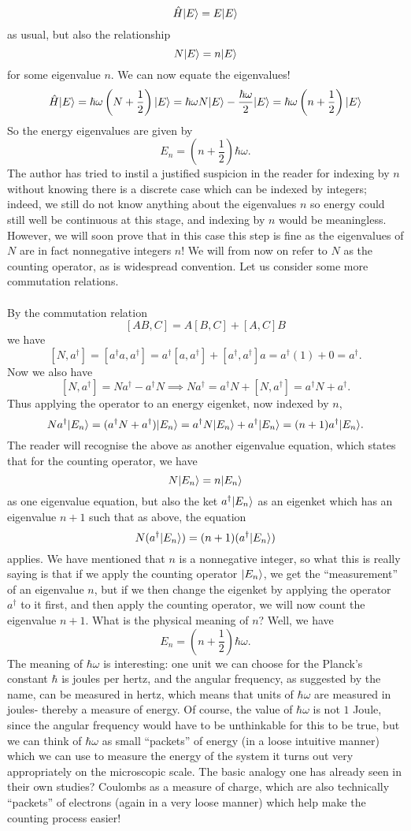 $$
\hat{H}|E\rangle=E|E\rangle
$$
as usual, but also the relationship
$$
N|E\rangle=n|E\rangle
$$
for some eigenvalue $n$. We can now equate the eigenvalues!
$$
\hat{H}|E\rangle=\hbar\omega\left(N+\frac{1}{2}\right)|E\rangle=\hbar \omega N|E\rangle-\frac{\hbar\omega}{2}|E\rangle=\hbar\omega\left(n+\frac{1}{2}\right)|E\rangle
$$
So the energy eigenvalues are given by 
$$
E_{n}=\left(n+\frac{1}{2}\right)\hbar\omega.
$$
The author has tried to instil a justified suspicion in the reader for indexing by $n$ without knowing there is a discrete case which can be indexed by integers; indeed, we still do not know anything about the eigenvalues $n$ so energy could still well be continuous at this stage, and indexing by $n$ would be meaningless. However, we will soon prove that in this case this step is fine as the eigenvalues of $N$ are in fact nonnegative integers $n$! We will from now on refer to $N$ as the counting operator, as is widespread convention. Let us consider some more commutation relations.
\\\\
By the commutation relation 
$$
[AB,C]=A[B,C]+[A,C]B
$$
we have
$$
[N,a^{\dagger}]=[a^{\dagger}a,a^{\dagger}]=a^{\dagger}[a,a^{\dagger}]+[a^{\dagger},a^{\dagger}]a=a^{\dagger}(1)+0=a^{\dagger}.
$$
Now we also have
$$
[N,a^{\dagger}]=Na^{\dagger}-a^{\dagger}N\implies Na^{\dagger}=a^{\dagger}N+[N,a^{\dagger}]=a^{\dagger}N+a^{\dagger}.
$$
Thus applying the operator to an energy eigenket, now indexed by $n$,
$$
Na^{\dagger}|E_{n}\rangle=(a^{\dagger}N+a^{\dagger})|E_{n}\rangle=a^{\dagger}N|E_{n}\rangle+a^{\dagger}|E_{n}\rangle=(n+1)a^{\dagger}|E_{n}\rangle.
$$
The reader will recognise the above as another eigenvalue equation, which states that for the counting operator, we have 
$$
N|E_{n}\rangle=n|E_{n}\rangle
$$
as one eigenvalue equation, but also the ket $a^{\dagger}|E_{n}\rangle$ as an eigenket which has an eigenvalue $n+1$ such that as above, the equation
$$
N(a^{\dagger}|E_{n}\rangle)=(n+1)(a^{\dagger}|E_{n}\rangle)
$$
applies. We have mentioned that $n$ is a nonnegative integer, so what this is really saying is that if we apply the counting operator $|E_{n}\rangle$, we get the ``measurement'' of an eigenvalue $n$, but if we then change the eigenket by applying the operator $a^{\dagger}$ to it first, and then apply the counting operator, we will now count the eigenvalue $n+1$. What is the physical meaning of $n$? Well, we have 
$$
E_{n}=\left(n+\frac{1}{2}\right)\hbar\omega.
$$
The meaning of $\hbar\omega$ is interesting: one unit we can choose for the Planck's constant $\hbar$ is joules per hertz, and the angular frequency, as suggested by the name, can be measured in hertz, which means that units of $\hbar\omega$ are measured in joules- thereby a measure of energy. Of course, the value of $\hbar\omega$ is not $1$ Joule, since the angular frequency would have to be unthinkable for this to be true, but we can think of $\hbar\omega$ as small ``packets'' of energy (in a loose intuitive manner) which we can use to measure the energy of the system it turns out very appropriately on the microscopic scale. The basic analogy one has already seen in their own studies? Coulombs as a measure of charge, which are also technically ``packets'' of electrons (again in a very loose manner) which help make the counting process easier!
